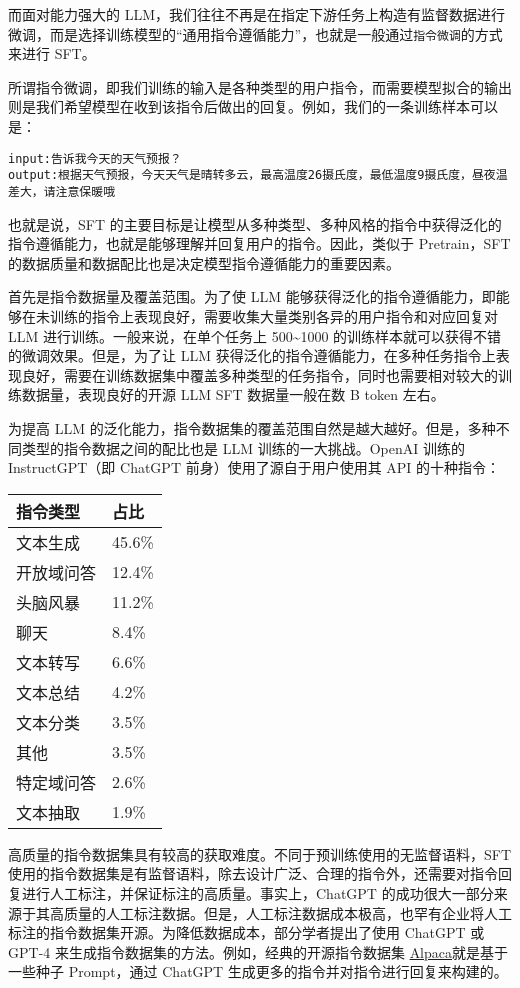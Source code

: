 \documentclass[12pt,a4paper]{book}
\begin{document}
而面对能力强大的
LLM，我们往往不再是在指定下游任务上构造有监督数据进行微调，而是选择训练模型的``通用指令遵循能力''，也就是一般通过\texttt{指令微调}的方式来进行
SFT。

所谓指令微调，即我们训练的输入是各种类型的用户指令，而需要模型拟合的输出则是我们希望模型在收到该指令后做出的回复。例如，我们的一条训练样本可以是：

\begin{verbatim}
input:告诉我今天的天气预报？
output:根据天气预报，今天天气是晴转多云，最高温度26摄氏度，最低温度9摄氏度，昼夜温差大，请注意保暖哦
\end{verbatim}

也就是说，SFT
的主要目标是让模型从多种类型、多种风格的指令中获得泛化的指令遵循能力，也就是能够理解并回复用户的指令。因此，类似于
Pretrain，SFT 的数据质量和数据配比也是决定模型指令遵循能力的重要因素。

首先是指令数据量及覆盖范围。为了使 LLM
能够获得泛化的指令遵循能力，即能够在未训练的指令上表现良好，需要收集大量类别各异的用户指令和对应回复对
LLM 进行训练。一般来说，在单个任务上 500\textasciitilde1000
的训练样本就可以获得不错的微调效果。但是，为了让 LLM
获得泛化的指令遵循能力，在多种任务指令上表现良好，需要在训练数据集中覆盖多种类型的任务指令，同时也需要相对较大的训练数据量，表现良好的开源
LLM SFT 数据量一般在数 B token 左右。

为提高 LLM
的泛化能力，指令数据集的覆盖范围自然是越大越好。但是，多种不同类型的指令数据之间的配比也是
LLM 训练的一大挑战。OpenAI 训练的 InstructGPT（即 ChatGPT
前身）使用了源自于用户使用其 API 的十种指令：

\begin{longtable}[]{@{}ll@{}}
\toprule\noalign{}
指令类型 & 占比 \\
\midrule\noalign{}
\endhead
\bottomrule\noalign{}
\endlastfoot
文本生成 & 45.6\% \\
开放域问答 & 12.4\% \\
头脑风暴 & 11.2\% \\
聊天 & 8.4\% \\
文本转写 & 6.6\% \\
文本总结 & 4.2\% \\
文本分类 & 3.5\% \\
其他 & 3.5\% \\
特定域问答 & 2.6\% \\
文本抽取 & 1.9\% \\
\end{longtable}

高质量的指令数据集具有较高的获取难度。不同于预训练使用的无监督语料，SFT
使用的指令数据集是有监督语料，除去设计广泛、合理的指令外，还需要对指令回复进行人工标注，并保证标注的高质量。事实上，ChatGPT
的成功很大一部分来源于其高质量的人工标注数据。但是，人工标注数据成本极高，也罕有企业将人工标注的指令数据集开源。为降低数据成本，部分学者提出了使用
ChatGPT 或 GPT-4 来生成指令数据集的方法。例如，经典的开源指令数据集
\href{https://github.com/yizhongw/self-instruct/blob/main/human_eval/user_oriented_instructions.jsonl}{Alpaca}就是基于一些种子
Prompt，通过 ChatGPT 生成更多的指令并对指令进行回复来构建的。
\end{document}
